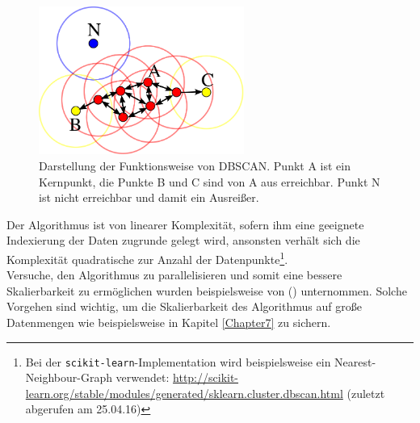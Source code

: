 \begin{figure}[h]
  \centering
  \includegraphics[width=0.6\textwidth]{../img/DBSCAN-Illustration.png}
  \caption[Darstellung der Funktionsweise von DBSCAN]{Darstellung der Funktionsweise von DBSCAN. Punkt A ist ein Kernpunkt, die
  Punkte B und C sind von A aus erreichbar. Punkt N ist nicht erreichbar und damit ein Ausreißer.\label{fig:dbscan}\footnotemark}
\end{figure}

Der Algorithmus ist von linearer Komplexität, sofern ihm eine geeignete Indexierung der Daten zugrunde gelegt wird, ansonsten
verhält sich die Komplexität quadratische zur Anzahl der Datenpunkte\footnote{Bei der
\verb|scikit-learn|-Implementation wird beispielsweise ein Nearest-Neighbour-Graph verwendet:
\url{http://scikit-learn.org/stable/modules/generated/sklearn.cluster.dbscan.html} (zuletzt abgerufen am 25.04.16)}.\\

Versuche, den Algorithmus zu parallelisieren und somit eine bessere Skalierbarkeit zu ermöglichen wurden beispielsweise von
(\cite{arlia2001experiments}) unternommen. Solche Vorgehen sind wichtig, um die Skalierbarkeit des Algorithmus auf große
Datenmengen wie beispielsweise in Kapitel \ref{Chapter7} zu sichern.
